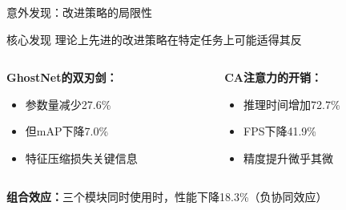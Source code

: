 \documentclass[aspectratio=169]{beamer}
\begin{document}
\begin{frame}{意外发现：改进策略的局限性}
    \begin{alertblock}{核心发现}
        理论上先进的改进策略在特定任务上可能适得其反
    \end{alertblock}
    
    \begin{columns}
        \begin{column}{0.5\textwidth}
            \textbf{GhostNet的双刃剑：}
            \begin{itemize}
                \item 参数量减少27.6\%
                \item 但mAP下降7.0\%
                \item 特征压缩损失关键信息
            \end{itemize}
        \end{column}
        \begin{column}{0.5\textwidth}
            \textbf{CA注意力的开销：}
            \begin{itemize}
                \item 推理时间增加72.7\%
                \item FPS下降41.9\%
                \item 精度提升微乎其微
            \end{itemize}
        \end{column}
    \end{columns}
    
    \vspace{0.5cm}
    \textbf{组合效应：}三个模块同时使用时，性能下降18.3\%（负协同效应）
\end{frame}
\end{document}
